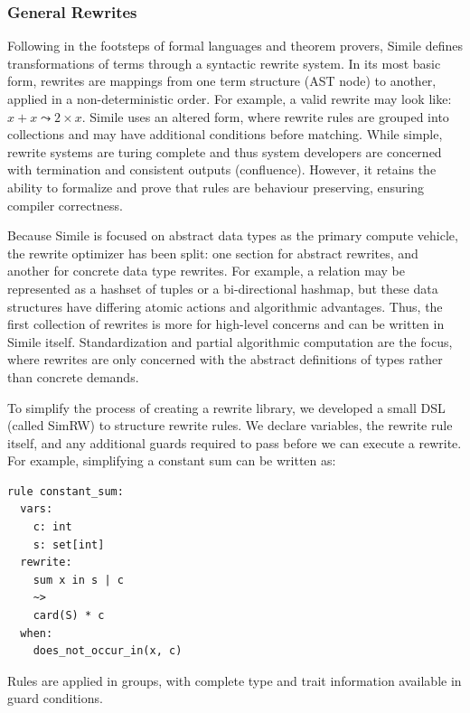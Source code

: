\subsubsection{General Rewrites}
Following in the footsteps of formal languages and theorem provers, Simile defines transformations of terms through a syntactic rewrite system. %
In its most basic form, rewrites are mappings from one term structure (AST node) to another, applied in a non-deterministic order. For example, a valid rewrite may look like: $x + x \leadsto 2\times x$. Simile uses an altered form, where rewrite rules are grouped into collections and may have additional conditions before matching. While simple, rewrite systems are turing complete and thus system developers are concerned with termination and consistent outputs (confluence). However, it retains the ability to formalize and prove that rules are behaviour preserving, ensuring compiler correctness.

Because Simile is focused on abstract data types as the primary compute vehicle, the rewrite optimizer has been split: one section for abstract rewrites, and another for concrete data type rewrites. For example, a relation may be represented as a hashset of tuples or a bi-directional hashmap, but these data structures have differing atomic actions and algorithmic advantages. Thus, the first collection of rewrites is more for high-level concerns and can be written in Simile itself. Standardization and partial algorithmic computation are the focus, where rewrites are only concerned with the abstract definitions of types rather than concrete demands.

To simplify the process of creating a rewrite library, we developed a small DSL (called SimRW) to structure rewrite rules. We declare variables, the rewrite rule itself, and any additional guards required to pass before we can execute a rewrite. For example, simplifying a constant sum can be written as:
\begin{lstlisting}
rule constant_sum:
  vars:
    c: int
    s: set[int]
  rewrite:
    sum x in s | c
    ~>
    card(S) * c
  when:
    does_not_occur_in(x, c)
\end{lstlisting}
Rules are applied in groups, with complete type and trait information available in guard conditions.

